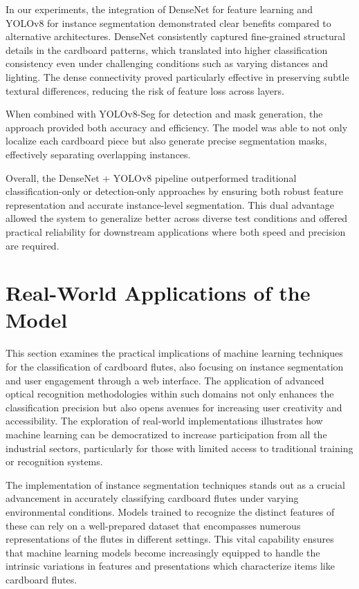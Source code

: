 In our experiments, the integration of DenseNet for feature learning and YOLOv8 for instance segmentation demonstrated clear benefits compared to alternative architectures. DenseNet consistently captured fine-grained structural details in the cardboard patterns, which translated into higher classification consistency even under challenging conditions such as varying distances and lighting. The dense connectivity proved particularly effective in preserving subtle textural differences, reducing the risk of feature loss across layers.

When combined with YOLOv8-Seg for detection and mask generation, the approach provided both accuracy and efficiency. The model was able to not only localize each cardboard piece but also generate precise segmentation masks, effectively separating overlapping instances.

Overall, the DenseNet + YOLOv8 pipeline outperformed traditional classification-only or detection-only approaches by ensuring both robust feature representation and accurate instance-level segmentation. This dual advantage allowed the system to generalize better across diverse test conditions and offered practical reliability for downstream applications where both speed and precision are required.


\section{Real-World Applications of the Model}
This section examines the practical implications of machine learning techniques for the classification of cardboard flutes, also focusing on instance segmentation and user engagement through a web interface. The application of advanced optical recognition methodologies within such domains not only enhances the classification precision but also opens avenues for increasing user creativity and accessibility. The exploration of real-world implementations illustrates how machine learning can be democratized to increase participation from all the industrial sectors, particularly for those with limited access to traditional training or recognition systems.

The implementation of instance segmentation techniques stands out as a crucial advancement in accurately classifying cardboard flutes under varying environmental conditions. Models trained to recognize the distinct features of these can rely on a well-prepared dataset that encompasses numerous representations of the flutes in different settings. This vital capability ensures that machine learning models become increasingly equipped to handle the intrinsic variations in features and presentations which characterize items like cardboard flutes.

